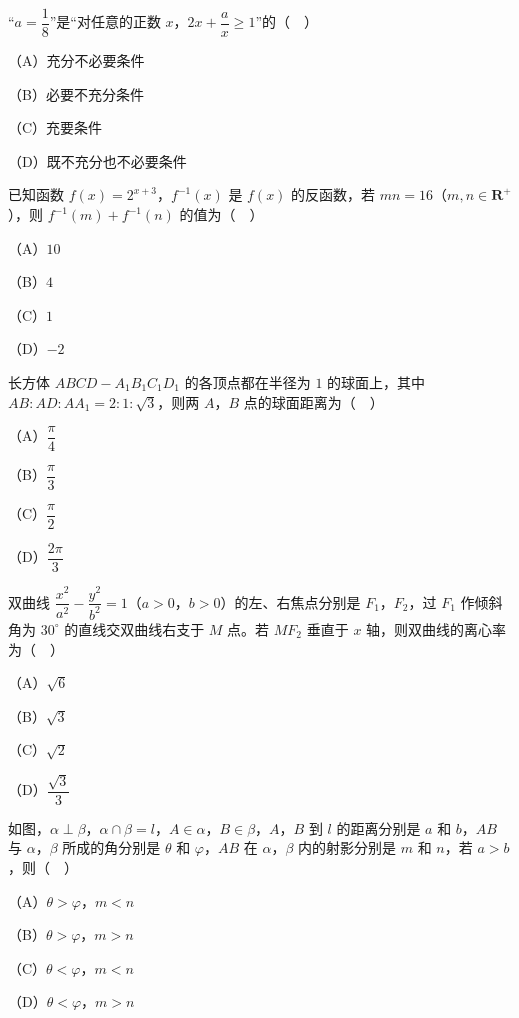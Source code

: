 \begin{question}
“$a=\dfrac18$”是“对任意的正数 $x$，$2x+\dfrac ax\geqslant1$”的（　）

（A）充分不必要条件

（B）必要不充分条件

（C）充要条件

（D）既不充分也不必要条件

\end{question}
\begin{question}
已知函数 $f(x)=2^{x+3}$，$f^{-1}(x)$ 是 $f(x)$ 的反函数，若 $mn=16$（$m,n\in\mathbf R^+$），则 $f^{-1}(m)+f^{-1}(n)$ 的值为（　）

（A）$10$

（B）$4$

（C）$1$

（D）$-2$

\end{question}
\begin{question}
长方体 $ABCD-A_1B_1C_1D_1$ 的各顶点都在半径为 $1$ 的球面上，其中 $AB:AD:AA_1=2:1:\sqrt3$，则两 $A$，$B$ 点的球面距离为（　）

（A）$\dfrac{\pi}4$

（B）$\dfrac{\pi}3$

（C）$\dfrac{\pi}2$

（D）$\dfrac{2\pi}3$

\end{question}
\begin{question}
双曲线 $\dfrac{x^2}{a^2}-\dfrac{y^2}{b^2}=1$（$a>0$，$b>0$）的左、右焦点分别是 $F_1$，$F_2$，过 $F_1$ 作倾斜角为 $30^\circ$ 的直线交双曲线右支于 $M$ 点。若 $MF_2$ 垂直于 $x$ 轴，则双曲线的离心率为（　）

（A）$\sqrt6$

（B）$\sqrt3$

（C）$\sqrt2$

（D）$\dfrac{\sqrt3}3$

\Needspace{0.4\textheight}
\end{question}
\begin{question}
如图，$\alpha\perp\beta$，$\alpha\cap\beta=l$，$A\in\alpha$，$B\in\beta$，$A$，$B$ 到 $l$ 的距离分别是 $a$ 和 $b$，$AB$ 与 $\alpha$，$\beta$ 所成的角分别是 $\theta$ 和 $\varphi$，$AB$ 在 $\alpha$，$\beta$ 内的射影分别是 $m$ 和 $n$，若 $a>b$，则（　）
\nopagebreak[4]
\begin{center}\end{center}
\nopagebreak[4]
（A）$\theta>\varphi$，$m<n$

（B）$\theta>\varphi$，$m>n$

（C）$\theta<\varphi$，$m<n$

（D）$\theta<\varphi$，$m>n$

\end{question}
